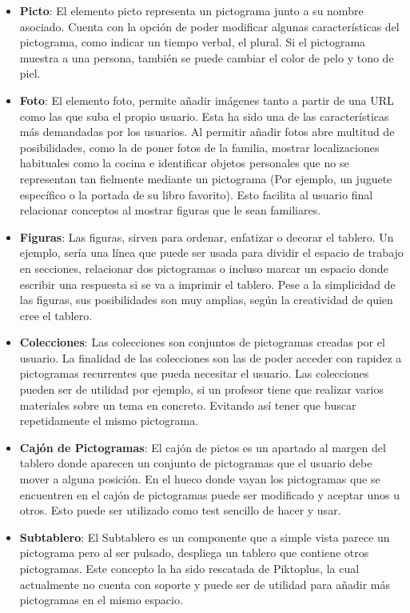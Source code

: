 \begin{itemize}
	
	
\item \textbf{Picto}: El elemento picto representa un pictograma junto a su nombre asociado. Cuenta con la opción de poder modificar algunas características del pictograma, como indicar un tiempo verbal, el plural. Si el pictograma muestra a una persona, también se puede cambiar el color de pelo y tono de piel.

\item \textbf{Foto}: El elemento foto, permite añadir imágenes tanto a partir de una URL como las que suba el propio usuario. Esta ha sido una de las características más demandadas por los usuarios. Al permitir añadir fotos abre multitud de posibilidades, como la de poner fotos de la familia, mostrar localizaciones habituales como la cocina e identificar objetos personales que no se representan tan fielmente mediante un pictograma (Por ejemplo, un juguete específico o la portada de su  libro favorito). Esto facilita al usuario final relacionar conceptos al mostrar figuras que le sean familiares.

\item \textbf{Figuras}: Las figuras, sirven para ordenar, enfatizar o decorar el tablero. Un ejemplo, sería una línea que puede ser usada para dividir el espacio de trabajo en secciones, relacionar dos pictogramas o incluso marcar un espacio donde escribir una respuesta si se va a imprimir el tablero. Pese a la simplicidad de las figuras, sus posibilidades son muy amplias, según  la creatividad de quien cree el tablero.


\item \textbf{Colecciones}: Las colecciones son conjuntos de pictogramas creadas por el usuario. La finalidad de las colecciones son las de poder acceder con rapidez a pictogramas recurrentes que pueda necesitar el usuario. Las colecciones pueden ser de utilidad por ejemplo, si un profesor tiene que realizar varios materiales sobre un tema en concreto. Evitando así tener que buscar repetidamente el mismo pictograma. 



\item \textbf{Cajón de Pictogramas}: El cajón de pictos es un apartado al margen del tablero donde aparecen un conjunto de pictogramas que el usuario debe mover a alguna posición. En el hueco donde vayan los pictogramas que se encuentren en el cajón de pictogramas puede ser modificado y aceptar unos u otros. Esto puede ser utilizado como test sencillo de hacer y usar.

\item \textbf{Subtablero}: El Subtablero es un componente que a simple vista parece un pictograma pero al ser pulsado, despliega un tablero que contiene otros pictogramas. Este concepto la ha sido rescatada de Piktoplus, la cual actualmente no cuenta con soporte y puede ser de utilidad para añadir más pictogramas en el mismo espacio.
\end{itemize}

